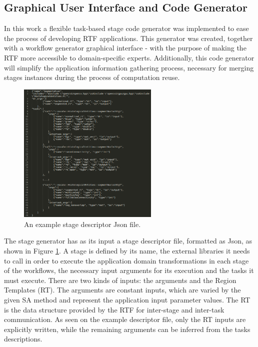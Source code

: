 \subsection{Graphical User Interface and Code Generator}
\label{sec:improve}

In this work a flexible task-based stage code generator was implemented to ease the process of developing RTF applications. This generator was created, together with a workflow generator graphical interface - with the purpose of making the RTF more accessible to domain-specific experts. Additionally, this code generator will simplify the application information gathering process, necessary for merging stages instances during the process of computation reuse.

\begin{figure}[h!]
\vspace{-4mm}
\begin{center}
\includegraphics[width=0.6\textwidth]{img/stage_gen.png}
\caption{An example stage descriptor Json file.}
\label{fig:cgen}
\end{center}
\vspace{-4mm}
\end{figure}

The stage generator has as its input a stage descriptor file, formatted as Json, as shown in Figure \ref{fig:cgen}. A stage is defined by its name, the external libraries it needs to call in order to execute the application domain transformations in each stage of the workflows, the necessary input arguments for its execution and the tasks it must execute. There are two kinds of inputs: the arguments and the Region Templates (RT). The arguments are constant inputs, which are varied by the given SA method and represent the application input parameter values. The RT is the data structure provided by the RTF for inter-stage and inter-task communication. As seen on the example descriptor file, only the RT inputs are explicitly written, while the remaining arguments can be inferred from the tasks descriptions.

